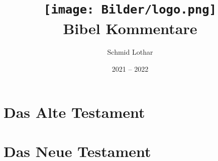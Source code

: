 \documentclass{inc/bible_class}
\author{Schmid Lothar}
\date{2021 -- 2022}
\title{
    \texttt{[image: Bilder/logo.png]}\\
    \textbf{Bibel Kommentare}
}
\begin{document}
\maketitle
\tableofcontents

\newpage


\chapter{Das Alte Testament}
% 
\chapter{Das Neue Testament}


\end{document}
